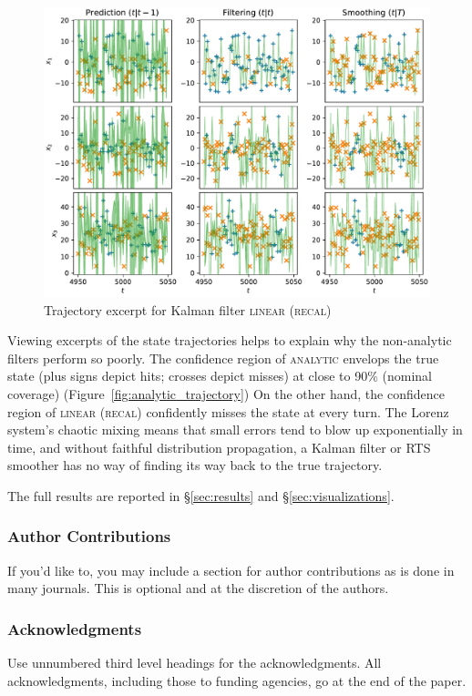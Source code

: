 \documentclass{article} %
\begin{document}
\begin{figure}
\begin{center}
\includegraphics[width=\linewidth]{generated/trajectory/Method.LINEAR-Recalibrate.YES.pdf}
\end{center}
\caption{\label{fig:linear_trajectory}Trajectory excerpt for Kalman filter \textsc{{\textsc{linear (recal)}}}}
\end{figure}

Viewing excerpts of the state trajectories helps to explain why the non-analytic filters perform so poorly.
The confidence region of \textsc{analytic} envelops the true state (plus signs depict hits; crosses depict misses) at close to 90\% (nominal coverage) (Figure~\ref{fig:analytic_trajectory})
On the other hand, the confidence region of \textsc{linear (recal)} confidently misses the state at every turn.
The Lorenz system's chaotic mixing means that small errors tend to blow up exponentially in time, and without faithful distribution propagation, a Kalman filter or RTS smoother has no way of finding its way back to the true trajectory.


The full results are reported in \S\ref{sec:results} and \S\ref{sec:visualizations}.

\subsubsection*{Author Contributions}
If you'd like to, you may include  a section for author contributions as is done
in many journals. This is optional and at the discretion of the authors.

\subsubsection*{Acknowledgments}
Use unnumbered third level headings for the acknowledgments. All
acknowledgments, including those to funding agencies, go at the end of the paper.
\end{document}
